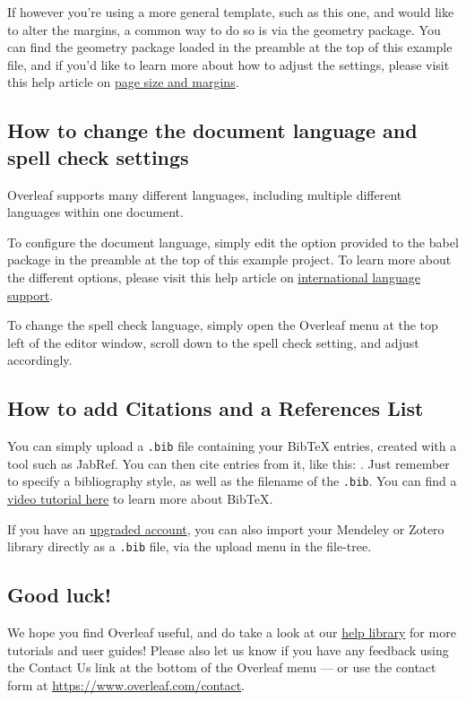 \documentclass{article}
\begin{document}
If however you're using a more general template, such as this one, and would like to alter the margins, a common way to do so is via the geometry package. You can find the geometry package loaded in the preamble at the top of this example file, and if you'd like to learn more about how to adjust the settings, please visit this help article on \href{https://www.overleaf.com/learn/latex/page_size_and_margins}{page size and margins}.

\subsection{How to change the document language and spell check settings}

Overleaf supports many different languages, including multiple different languages within one document. 

To configure the document language, simply edit the option provided to the babel package in the preamble at the top of this example project. To learn more about the different options, please visit this help article on \href{https://www.overleaf.com/learn/latex/International_language_support}{international language support}.

To change the spell check language, simply open the Overleaf menu at the top left of the editor window, scroll down to the spell check setting, and adjust accordingly.

\subsection{How to add Citations and a References List}

You can simply upload a \verb|.bib| file containing your BibTeX entries, created with a tool such as JabRef. You can then cite entries from it, like this: \cite{greenwade93}. Just remember to specify a bibliography style, as well as the filename of the \verb|.bib|. You can find a \href{https://www.overleaf.com/help/97-how-to-include-a-bibliography-using-bibtex}{video tutorial here} to learn more about BibTeX.

If you have an \href{https://www.overleaf.com/user/subscription/plans}{upgraded account}, you can also import your Mendeley or Zotero library directly as a \verb|.bib| file, via the upload menu in the file-tree.

\subsection{Good luck!}

We hope you find Overleaf useful, and do take a look at our \href{https://www.overleaf.com/learn}{help library} for more tutorials and user guides! Please also let us know if you have any feedback using the Contact Us link at the bottom of the Overleaf menu --- or use the contact form at \url{https://www.overleaf.com/contact}.



\end{document}
